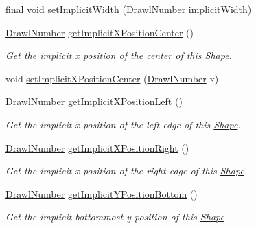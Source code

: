 \begin{DoxyCompactItemize}
\item 
final void \hyperlink{classcom_1_1aarrelaakso_1_1drawl_1_1_shape_a03a408248a797d817ab32d5b833d5e1d}{set\+Implicit\+Width} (\hyperlink{classcom_1_1aarrelaakso_1_1drawl_1_1_drawl_number}{Drawl\+Number} \hyperlink{classcom_1_1aarrelaakso_1_1drawl_1_1_shape_a00c6b870d70449a79a000a3374ae041c}{implicit\+Width})
\item 
\hyperlink{classcom_1_1aarrelaakso_1_1drawl_1_1_drawl_number}{Drawl\+Number} \hyperlink{classcom_1_1aarrelaakso_1_1drawl_1_1_shape_ac7a69f5cb9dd954f5054a3bebc35af41}{get\+Implicit\+X\+Position\+Center} ()
\begin{DoxyCompactList}\small\item\em Get the implicit x position of the center of this \hyperlink{classcom_1_1aarrelaakso_1_1drawl_1_1_shape}{Shape}. \end{DoxyCompactList}\item 
void \hyperlink{classcom_1_1aarrelaakso_1_1drawl_1_1_shape_a58226399cee0d166f45e807869af0bc8}{set\+Implicit\+X\+Position\+Center} (\hyperlink{classcom_1_1aarrelaakso_1_1drawl_1_1_drawl_number}{Drawl\+Number} x)
\item 
\hyperlink{classcom_1_1aarrelaakso_1_1drawl_1_1_drawl_number}{Drawl\+Number} \hyperlink{classcom_1_1aarrelaakso_1_1drawl_1_1_shape_a3cc59779e8ce4a98ff2309e0fb414527}{get\+Implicit\+X\+Position\+Left} ()
\begin{DoxyCompactList}\small\item\em Get the implicit x position of the left edge of this \hyperlink{classcom_1_1aarrelaakso_1_1drawl_1_1_shape}{Shape}. \end{DoxyCompactList}\item 
\hyperlink{classcom_1_1aarrelaakso_1_1drawl_1_1_drawl_number}{Drawl\+Number} \hyperlink{classcom_1_1aarrelaakso_1_1drawl_1_1_shape_aedcaf32e6be1114111e5ee2ddb1214a3}{get\+Implicit\+X\+Position\+Right} ()
\begin{DoxyCompactList}\small\item\em Get the implicit x position of the right edge of this \hyperlink{classcom_1_1aarrelaakso_1_1drawl_1_1_shape}{Shape}. \end{DoxyCompactList}\item 
\hyperlink{classcom_1_1aarrelaakso_1_1drawl_1_1_drawl_number}{Drawl\+Number} \hyperlink{classcom_1_1aarrelaakso_1_1drawl_1_1_shape_af04961079cb3993d8f73670e6695415b}{get\+Implicit\+Y\+Position\+Bottom} ()
\begin{DoxyCompactList}\small\item\em Get the implicit bottommost y-\/position of this \hyperlink{classcom_1_1aarrelaakso_1_1drawl_1_1_shape}{Shape}. \end{DoxyCompactList}\item 

\end{DoxyCompactItemize}
